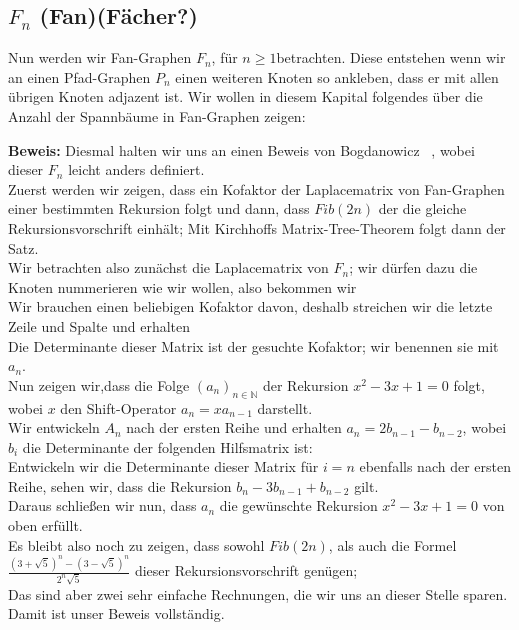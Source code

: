 \subsection{$F_n$ (Fan)(Fächer?)}
Nun werden wir Fan-Graphen $F_n$, für $n \geq 1$betrachten. Diese entstehen wenn wir an einen Pfad-Graphen $P_{n}$ einen weiteren Knoten so ankleben, dass er mit allen übrigen Knoten adjazent ist. 
Wir wollen in diesem Kapital folgendes über die Anzahl der Spannbäume in Fan-Graphen zeigen:
\begin{Tms}
 \label{ThmFn}
\end{Tms}
\textbf{Beweis:}
Diesmal halten wir uns an einen Beweis von Bogdanowicz ~\cite{bogdanowicz_2008}, wobei dieser $F_n$ leicht anders definiert.\\
Zuerst werden wir zeigen, dass ein Kofaktor der Laplacematrix von Fan-Graphen einer bestimmten Rekursion folgt und dann, dass $Fib(2n)$ der die gleiche Rekursionsvorschrift einhält; Mit Kirchhoffs Matrix-Tree-Theorem folgt dann der Satz.\\
Wir betrachten also zunächst die Laplacematrix von $F_n$; wir dürfen dazu die Knoten nummerieren wie wir wollen, also bekommen wir\\
Wir brauchen einen beliebigen Kofaktor davon, deshalb streichen wir die letzte Zeile und Spalte und erhalten\\
Die Determinante dieser Matrix ist der gesuchte Kofaktor; wir benennen sie mit $a_n$.\\
Nun zeigen wir,dass die Folge $(a_n)_{n \in \mathbb{N}}$ der Rekursion $x^2-3x+1=0$ folgt, \\wobei $x$ den Shift-Operator $a_n = xa_{n-1}$ darstellt. \\
Wir entwickeln $A_n$ nach der ersten Reihe und erhalten $a_n = 2b_{n-1} - b_{n-2}$, wobei $b_i$ die Determinante der folgenden Hilfsmatrix ist:\\
Entwickeln wir die Determinante dieser Matrix für $i=n$ ebenfalls nach der ersten Reihe, sehen wir, dass die Rekursion $b_n-3b_{n-1} + b_{n-2}$ gilt.\\
Daraus schließen wir nun, dass $a_n$ die gewünschte Rekursion $x^2-3x+1=0$ von oben erfüllt.\\
Es bleibt also noch zu zeigen, dass sowohl $Fib(2n)$, als auch die Formel $\frac{(3+\sqrt{5})^{n}-(3-\sqrt{5})^{n}}{2^{n}\sqrt{5}}$ dieser Rekursionsvorschrift genügen;\\ 
Das sind aber zwei sehr einfache Rechnungen, die wir uns an dieser Stelle sparen.\\
Damit ist unser Beweis vollständig.\\
